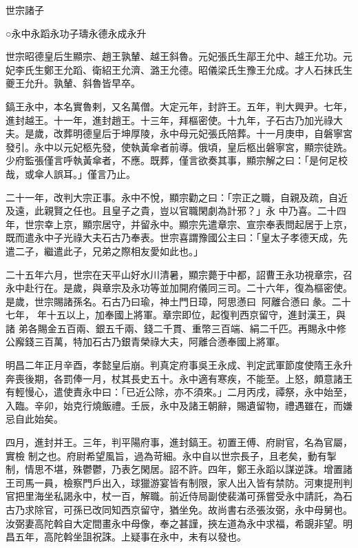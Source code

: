 
\begin{pinyinscope}

 世宗諸子



 ○永中永蹈永功子璹永德永成永升



 世宗昭德皇后生顯宗、趙王孰輦、越王斜魯。元妃張氏生鄗王允中、越王允功。元妃李氏生鄭王允蹈、衛紹王允濟、潞王允德。昭儀梁氏生豫王允成。才人石抹氏生夔王允升。孰輦、斜魯皆早卒。



 鎬王永中，本名實魯剌，又名萬僧。大定元年，封許王。五年，判大興尹。七年，進封越王。十一年，進封趙王。十三年，拜樞密使。十九年，子石古乃加光祿大夫。是歲，改葬明德皇后于坤厚陵，永中母元妃張氏陪葬。十一月庚申，自磐寧宮發引。永中以元妃柩先發，使執黃傘者前導。俄頃，皇后柩出磐寧宮，顯宗徒跣。少府監張僅言呼執黃傘者，不應。既葬，僅言欲奏其事，顯宗解之曰：「是何足校哉，或傘人誤耳。」僅言乃止。



 二十一年，改判大宗正事。永中不悅，顯宗勸之曰：「宗正之職，自親及疏，自近及遠，此親賢之任也。且皇子之貴，豈以官職閑劇為計邪？」永
 中乃喜。二十四年，世宗幸上京，顯宗居守，并留永中。顯宗先遣章宗、宣宗奉表問起居于上京，既而遣永中子光祿大夫石古乃奉表。世宗喜謂豫國公主曰：「皇太子孝德天成，先遣二子，繼遣此子，兄弟之際相友愛如此也。」



 二十五年六月，世宗在天平山好水川清暑，顯宗薨于中都，詔曹王永功視章宗，召永中赴行在。是歲，與章宗及永功等並加開府儀同三司。二十六年，復為樞密使。是歲，世宗賜諸孫名。石古乃曰瑜，神土門日璋，阿思懣曰，阿離合懣曰彖。二十七年，年十五以上，加奉國上將軍。章宗即位，起復判西京留守，進封漢王，與諸
 弟各賜金五百兩、銀五千兩、錢二千貫、重幣三百端、絹二千匹。再賜永中修公廨錢三百萬，特加石古乃銀青榮祿大夫，阿離合懣奉國上將軍。



 明昌二年正月辛酉，孝懿皇后崩。判真定府事吳王永成、判定武軍節度使隋王永升奔喪後期，各罰俸一月，杖其長史五十。永中適有寒疾，不能至。上怒，頗意諸王有輕慢心，遣使責永中曰：「已近公除，亦不須來。」二月丙戌，禫祭，永中始至，入臨。辛卯，始克行燒飯禮。壬辰，永中及諸王朝辭，賜遺留物，禮遇雖在，而嫌忌自此始矣。



 四月，進封并王。三年，判平陽府事，進封鎬王。初置王傅、府尉官，名為官屬，實檢
 制之也。府尉希望風旨，過為苛細。永中自以世宗長子，且老矣，動有掣制，情思不堪，殊鬱鬱，乃表乞閑居。詔不許。四年，鄭王永蹈以謀逆誅。增置諸王司馬一員，檢察門戶出入，球獵游宴皆有制限，家人出入皆有禁防。河東提刑判官把里海坐私謁永中，杖一百，解職。前近侍局副使裴滿可孫嘗受永中請託，為石古乃求除官，可孫已改同知西京留守，猶坐免。故尚書右丞張汝弼，永中母舅也。汝弼妻高陀斡自大定間畫永中母像，奉之甚謹，挾左道為永中求福，希覬非望。明昌五年，高陀斡坐詛祝誅。上疑事在永中，未有以發也。




\end{pinyinscope}
